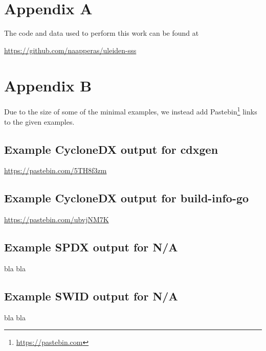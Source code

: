 \appendix

\section{Appendix A}

The code and data used to perform this work can be found at
\begin{center}
    \href{https://github.com/Naapperas/uleiden-sss/tree/main/assignments/2}{https://github.com/naapperas/uleiden-sss}
\end{center}

\section{Appendix B}


Due to the size of some of the minimal examples, we instead add Pastebin\footnote{\href{https://pastebin.com}{https://pastebin.com}} links to the given examples.

\subsection{Example CycloneDX output for \textbf{cdxgen}}

\href{https://pastebin.com/5TH8f3zm}{https://pastebin.com/5TH8f3zm}

\subsection{Example CycloneDX output for \textbf{build-info-go}}

\href{https://pastebin.com/ubvjNM7K}{https://pastebin.com/ubvjNM7K}

\subsection{Example SPDX output for \textbf{N/A}}

bla bla


\subsection{Example SWID output for \textbf{N/A}}

bla bla


